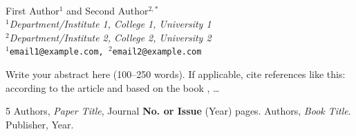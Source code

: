 \documentclass[a4paper, 12pt]{article}
\begin{document}
\pagestyle{fancy}
\fancyhead{}

\\ First Author$^{1}$ and Second Author$^{2,*}$
\\ \textit{$^{1}$Department/Institute 1, College 1, University 1}
\\ \textit{$^{2}$Department/Institute 2, College 2, University 2}
\\ \texttt{$^{1}$email1@example.com, $^{2}$email2@example.com}

\medskip
\medskip

\noindent Write your abstract here (100--250 words). If applicable, cite
references like this: according to the article \cite{cite_key1} and based
on the book \cite{cite_key2}, \ldots


\vspace{2cm}
\renewcommand{\refname}{\normalsize References}
\begin{thebibliography}{5}
 Authors, \textit{Paper Title}, Journal {\bf No. or Issue} (Year) pages.
 Authors, \textit{Book Title}. Publisher, Year.
\end{thebibliography}
\end{document}
